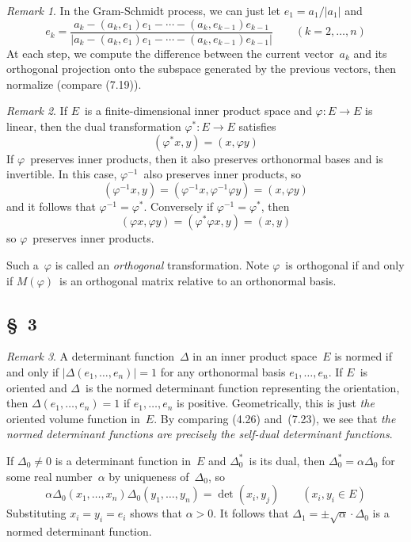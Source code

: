 \documentclass[letterpaper,12pt]{article}
\newcommand{\mult}{\cdot}
\newcommand{\iprod}[2]{(#1,#2)}
\newcommand{\norm}[1]{|#1|}
\newcommand{\abs}[1]{|#1|}
\theoremstyle{definition}
\theoremstyle{remark}
\newtheorem*{rmk}{Remark}
\begin{document}
\begin{rmk}
In the Gram-Schmidt process, we can just let \(e_1=a_1/\norm{a_1}\) and
\[e_k=\frac{a_k-\iprod{a_k}{e_1}e_1-\cdots-\iprod{a_k}{e_{k-1}}e_{k-1}}{\norm{a_k-\iprod{a_k}{e_1}e_1-\cdots-\iprod{a_k}{e_{k-1}}e_{k-1}}}\qquad(k=2,\ldots,n)\]
At each step, we compute the difference between the current vector~\(a_k\) and its orthogonal projection onto the subspace generated by the previous vectors, then normalize (compare (7.19)).
\end{rmk}

\begin{rmk}
If \(E\)~is a finite-dimensional inner product space and \(\varphi:E\to E\) is linear, then the dual transformation \(\varphi^*:E\to E\) satisfies
\[\iprod{\varphi^* x}{y}=\iprod{x}{\varphi y}\]
If \(\varphi\)~preserves inner products, then it also preserves orthonormal bases and is invertible. In this case, \(\varphi^{-1}\)~also preserves inner products, so
\[\iprod{\varphi^{-1}x}{y}=\iprod{\varphi^{-1}x}{\varphi^{-1}\varphi y}=\iprod{x}{\varphi y}\]
and it follows that \(\varphi^{-1}=\varphi^*\). Conversely if \(\varphi^{-1}=\varphi^*\), then
\[\iprod{\varphi x}{\varphi y}=\iprod{\varphi^*\varphi x}{y}=\iprod{x}{y}\]
so \(\varphi\)~preserves inner products.

Such a~\(\varphi\) is called an \emph{orthogonal} transformation. Note \(\varphi\)~is orthogonal if and only if \(M(\varphi)\)~is an orthogonal matrix relative to an orthonormal basis.
\end{rmk}

\subsection*{\S~3}
\begin{rmk}
A determinant function~\(\Delta\) in an inner product space~\(E\) is normed if and only if \(\abs{\Delta(e_1,\ldots,e_n)}=1\) for any orthonormal basis \(e_1,\ldots,e_n\). If \(E\)~is oriented and \(\Delta\)~is the normed determinant function representing the orientation, then \(\Delta(e_1,\ldots,e_n)=1\) if \(e_1,\ldots,e_n\) is positive. Geometrically, this is just \emph{the} oriented volume function in~\(E\). By comparing (4.26) and~(7.23), we see that \emph{the normed determinant functions are precisely the self-dual determinant functions}.

If \(\Delta_0\ne 0\) is a determinant function in~\(E\) and \(\Delta_0^*\)~is its dual, then \(\Delta_0^*=\alpha\Delta_0\) for some real number~\(\alpha\) by uniqueness of~\(\Delta_0\), so
\[\alpha\Delta_0(x_1,\ldots,x_n)\Delta_0(y_1,\ldots,y_n)=\det\iprod{x_i}{y_j}\qquad(x_i,y_i\in E)\]
Substituting \(x_i=y_i=e_i\) shows that \(\alpha>0\). It follows that \(\Delta_1=\pm\sqrt{\alpha}\mult\Delta_0\) is a normed determinant function.
\end{rmk}
\end{document}
